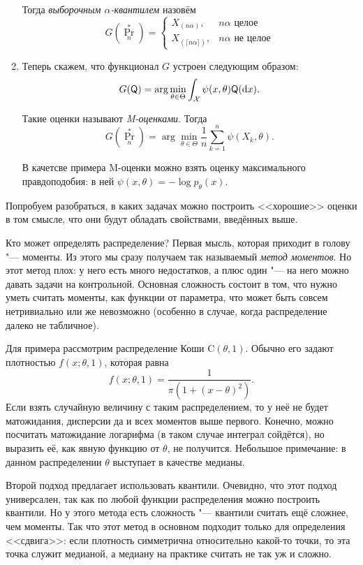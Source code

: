 \begin{enumerate}[label=(\alph*)]
	Тогда \emph{выборочным $\alpha$-квантилем} назовём 
	\[
		G(\Pr_{n}^{*}) = \begin{cases}
		X_{(n\alpha)}, & n\alpha \text{ целое} \\
		X_{(\lceil n\alpha \rceil)}, & n\alpha \text{ не целое}
		\end{cases}
	\]
	
	\item Теперь скажем, что функционал $G$ устроен следующим образом:
	\[
		G(\mathsf{Q}) = \arg\min_{\theta \in \Theta} \int_{\mathcal{X}} \psi(x, \theta)\mathsf{Q}(\mathop{}\!\mathrm{d} x).
	\]
	
	Такие оценки называют \emph{M-оценками}. Тогда
	\[
		G(\Pr_{n}^{*}) = \arg\min_{\theta \in \Theta} \frac{1}{n}\sum_{k = 1}^{n} \psi(X_{k}, \theta).
	\]
	
	В качетсве примера M-оценки можно взять оценку максимального правдоподобия: в ней $\psi(x, \theta) = -\log p_{\theta}(x)$.
\end{enumerate}

Попробуем разобраться, в каких задачах можно построить <<хорошие>> оценки в том смысле, что они будут обладать свойствами, введённых выше. 

Кто может определять распределение?
Первая мысль, которая приходит в голову "--- моменты.
Из этого мы сразу получаем так называемый \emph{метод моментов}.
Но этот метод плох: у него есть много недостатков, а плюс один "--- на него можно давать задачи на контрольной.
Основная сложность состоит в том, что нужно уметь считать моменты, как функции от параметра, что может быть совсем нетривиально или же невозможно (особенно в случае, когда распределение далеко не табличное).

Для примера рассмотрим распределение Коши $\mathrm{C}(\theta, 1)$.
Обычно его задают плотностью $f(x; \theta, 1)$, которая равна
\[
	f(x; \theta, 1) = \frac{1}{\pi(1 + (x - \theta)^{2})}.
\]
Если взять случайную величину с таким распределением, то у неё не будет матожидания, дисперсии да и всех моментов выше первого.
Конечно, можно посчитать матожидание логарифма (в таком случае интеграл сойдётся), но выразить её, как явную функцию от $\theta$, не получится.
Небольшое примечание: в данном распределении $\theta$ выступает в качестве медианы.

Второй подход предлагает использовать квантили.
Очевидно, что этот подход универсален, так как по любой функции распределения можно построить квантили.
Но у этого метода есть сложность "--- квантили считать ещё сложнее, чем моменты.
Так что этот метод в основном подходит только для определения <<сдвига>>: если плотность симметрична относительно какой-то точки, то эта точка служит медианой, а медиану на практике считать не так уж и сложно.

